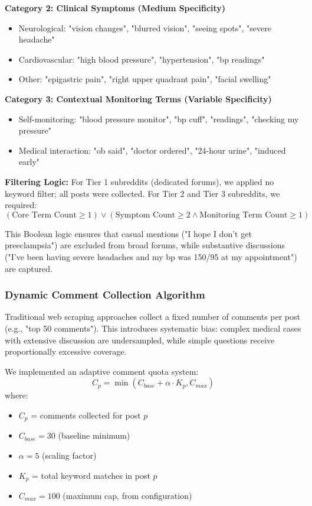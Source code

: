 \documentclass[12pt, a4paper]{article}
\begin{document}
\textbf{Category 2: Clinical Symptoms (Medium Specificity)}
\begin{itemize}
    \item Neurological: "vision changes", "blurred vision", "seeing spots", "severe headache"
    \item Cardiovascular: "high blood pressure", "hypertension", "bp readings"
    \item Other: "epigastric pain", "right upper quadrant pain", "facial swelling"
\end{itemize}

\textbf{Category 3: Contextual Monitoring Terms (Variable Specificity)}
\begin{itemize}
    \item Self-monitoring: "blood pressure monitor", "bp cuff", "readings", "checking my pressure"
    \item Medical interaction: "ob said", "doctor ordered", "24-hour urine", "induced early"
\end{itemize}

\textbf{Filtering Logic:}
For Tier 1 subreddits (dedicated forums), we applied no keyword filter; all posts were collected. For Tier 2 and Tier 3 subreddits, we required:
\begin{equation}
    (\text{Core Term Count} \geq 1) \lor (\text{Symptom Count} \geq 2 \land \text{Monitoring Term Count} \geq 1)
\end{equation}

This Boolean logic ensures that casual mentions ("I hope I don't get preeclampsia") are excluded from broad forums, while substantive discussions ("I've been having severe headaches and my bp was 150/95 at my appointment") are captured.

\subsubsection{Dynamic Comment Collection Algorithm}
Traditional web scraping approaches collect a fixed number of comments per post (e.g., "top 50 comments"). This introduces systematic bias: complex medical cases with extensive discussion are undersampled, while simple questions receive proportionally excessive coverage.

We implemented an adaptive comment quota system:
\begin{equation}
    C_p = \min(C_{base} + \alpha \cdot K_p, C_{max})
\end{equation}
where:
\begin{itemize}
    \item $C_p$ = comments collected for post $p$
    \item $C_{base} = 30$ (baseline minimum)
    \item $\alpha = 5$ (scaling factor)
    \item $K_p$ = total keyword matches in post $p$
    \item $C_{max} = 100$ (maximum cap, from configuration)
\end{itemize}
\end{document}
